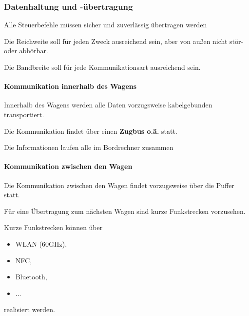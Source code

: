 \subsubsection{Datenhaltung und -übertragung}
\begin{feat}
Alle Steuerbefehle müssen sicher und zuverlässig übertragen werden
\end{feat}
\begin{feat}
Die Reichweite soll für jeden Zweck ausreichend sein, aber von außen nicht stör- oder abhörbar.
\end{feat}
\begin{feat}
Die Bandbreite soll für jede Kommunikationsart ausreichend sein.
\end{feat}

\paragraph{Kommunikation innerhalb des Wagens}
\begin{feat}
Innerhalb des Wagens werden alle Daten vorzugsweise kabelgebunden transportiert. 
\end{feat}
\begin{feat}
Die Kommunikation findet über einen \textbf{Zugbus o.ä.} statt.
\end{feat}
\begin{feat}
Die Informationen laufen alle im Bordrechner zusammen
\end{feat}

\paragraph{Kommunikation zwischen den Wagen}
\begin{feat}
Die Kommunikation zwischen den Wagen findet vorzugsweise über die Puffer statt.
\end{feat}
\begin{feat}
Für eine Übertragung zum nächsten Wagen sind kurze Funkstrecken vorzusehen.
\end{feat}
\begin{rem}[zu Anf. 34]
Kurze Funkstrecken können über
\begin{itemize}
    \item WLAN (60GHz),
    \item NFC,
    \item Bluetooth,
    \item ...
\end{itemize}
realisiert werden.
\end{rem}

